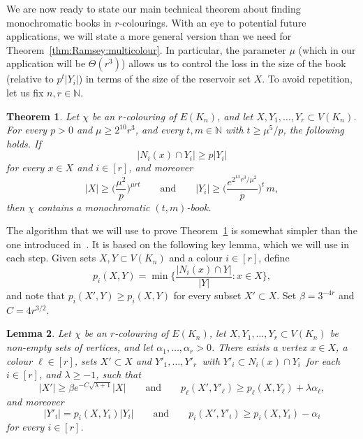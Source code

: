 \documentclass[12pt,reqno]{amsart}
\newtheorem{theorem}{Theorem}[section]
\newtheorem{lemma}[theorem]{Lemma}
\theoremstyle{definition}
\theoremstyle{remark}
\newcommand\N{\mathbb{N}}
\renewcommand{\ge}{\geqslant}
\def\N{\mathbb{N}}
\begin{document}
We are now ready to state our main technical theorem about finding monochromatic books in \(r\)-colourings. With an eye to potential future applications, we will state a more general version than we need for Theorem~\ref{thm:Ramsey:multicolour}. In particular, the parameter \(\mu\) (which in our application will be \(\Theta(r^3)\)) allows us to control the loss in the size of the book (relative to \(p^t |Y_i|\)) in terms of the size of the reservoir set \(X\). To avoid repetition, let us fix \(n,r \in \N\).

%
\begin{theorem}
	\label{thm:book}
	Let\/ \(\chi\) be an\/ \(r\)-colouring of\/ \(E(K_n)\), and let\/ \(X,Y_1,\ldots,Y_r \subset V(K_n)\).
	For every \(p > 0\) and \(\mu \ge 2^{10} r^3\), and every \(t,m \in \N\) with \(t \ge \mu^5 / p\), the following holds. If
	\begin{equation*}
		|N_i(x) \cap Y_i| \ge p|Y_i|
	\end{equation*}
	for every \(x \in X\) and \(i \in [r]\), and moreover
	\begin{equation*}
		|X| \ge \bigg( \frac{\mu^2}{p} \bigg)^{\mu r t} \qquad \text{and} \qquad |Y_i| \ge \bigg( \frac{e^{2^{13} r^3 / \mu^2}}{p} \bigg)^t \, m,
	\end{equation*}
	then \(\chi\) contains a monochromatic \((t,m)\)-book.
\end{theorem}
%

The algorithm that we will use to prove Theorem~\ref{thm:book} is somewhat simpler than the one introduced in~\cite{CGMS}. It is based on the following key lemma, which we will use in each step. Given sets \(X,Y \subset V(K_n)\) and a colour \(i \in [r]\), define
%
\begin{equation*}
	p_i(X,Y) = \min\bigg\{ \frac{|N_i(x) \cap Y|}{|Y|} : x \in X \bigg\},
\end{equation*}
%
and note that \(p_i(X',Y) \ge p_i(X,Y)\) for every subset \(X' \subset X\). Set \(\beta = 3^{-4r}\) and \(C = 4r^{3/2}\).

%
\begin{lemma}
	\label{key:lemma}
	Let\/ \(\chi\) be an\/ \(r\)-colouring of\/ \(E(K_n)\), let\/ \(X,Y_1,\ldots,Y_r \subset V(K_n)\) be non-empty sets of vertices, and let \(\alpha_1,\ldots,\alpha_r > 0\). There exists a vertex \(x \in X\), a colour \(\ell \in [r]\), sets \(X' \subset X\) and\/ \(Y'_1,\ldots,Y'_r\,\) with\/ \(Y'_i \subset N_i(x) \cap Y_i\,\) for each \(i \in [r]\), and\/ \(\lambda \ge -1\), such that
	\begin{equation}
		\label{eq:key:ell}
		|X'| \ge \beta e^{- C \sqrt{\lambda + 1}} |X| \qquad \text{and} \qquad p_\ell( X', Y'_\ell ) \ge p_\ell(X,Y_\ell) + \lambda \alpha_\ell,
	\end{equation}
	and moreover
	\begin{equation}
		\label{eq:key:alli}
		|Y'_i| = p_i(X,Y_i) |Y_i| \qquad \text{and} \qquad p_i( X', Y'_i ) \ge p_i(X,Y_i) - \alpha_i
	\end{equation}
	for every \(i \in [r]\).
\end{lemma}
%
\end{document}
